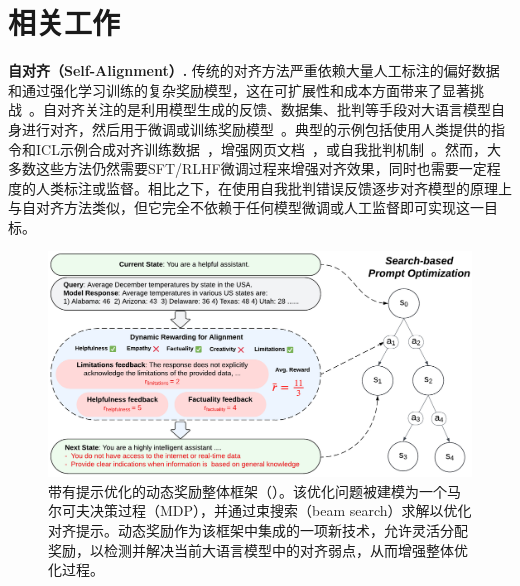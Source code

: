 \section{相关工作}
\vspace{-5pt}

\noindent \textbf{自对齐（Self-Alignment）.}
传统的对齐方法严重依赖大量人工标注的偏好数据和通过强化学习训练的复杂奖励模型，这在可扩展性和成本方面带来了显著挑战~\cite{ouyang2022training}。自对齐关注的是利用模型生成的反馈、数据集、批判等手段对大语言模型自身进行对齐，然后用于微调或训练奖励模型~\cite{lee2023rlaif, bai2022training, cao2024towards, wang2024step, guo2024human}。典型的示例包括使用人类提供的指令和ICL示例合成对齐训练数据~\cite{wang2022self, kim2023aligning, sun2024principle}，增强网页文档~\cite{li2023self}，或自我批判机制~\cite{bai2022constitutional, madaan2024self}。然而，大多数这些方法仍然需要SFT/RLHF微调过程来增强对齐效果，同时也需要一定程度的人类标注或监督。相比之下，\ours 在使用自我批判错误反馈逐步对齐模型的原理上与自对齐方法类似，但它完全不依赖于任何模型微调或人工监督即可实现这一目标。

\begin{figure}[ht]
    \centering
    \includegraphics[width=0.95\linewidth]{images/Dynamic_Rewarding.pdf}
    \vspace{-8pt}
    \caption{带有提示优化的动态奖励整体框架（\ours）。该优化问题被建模为一个马尔可夫决策过程（MDP），并通过束搜索（beam search）求解以优化对齐提示。动态奖励作为该框架中集成的一项新技术，允许灵活分配奖励，以检测并解决当前大语言模型中的对齐弱点，从而增强整体优化过程。}
    \label{fig:dynamic_rewarding}
    \vspace{-15pt}
\end{figure}

